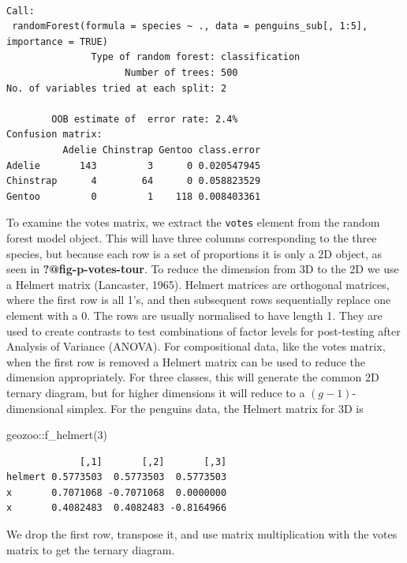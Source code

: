 \documentclass[
  letterpaper,
]{book}
\newenvironment{Shaded}{\begin{snugshade}}{\end{snugshade}}
\newcommand{\DecValTok}[1]{\textcolor[rgb]{0.68,0.00,0.00}{#1}}
\newcommand{\FunctionTok}[1]{\textcolor[rgb]{0.28,0.35,0.67}{#1}}
\newcommand{\NormalTok}[1]{\textcolor[rgb]{0.00,0.23,0.31}{#1}}
\newcommand{\SpecialCharTok}[1]{\textcolor[rgb]{0.37,0.37,0.37}{#1}}
\begin{document}
\begin{verbatim}

Call:
 randomForest(formula = species ~ ., data = penguins_sub[, 1:5],      importance = TRUE) 
               Type of random forest: classification
                     Number of trees: 500
No. of variables tried at each split: 2

        OOB estimate of  error rate: 2.4%
Confusion matrix:
          Adelie Chinstrap Gentoo class.error
Adelie       143         3      0 0.020547945
Chinstrap      4        64      0 0.058823529
Gentoo         0         1    118 0.008403361
\end{verbatim}

To examine the votes matrix, we extract the \texttt{votes} element from
the random forest model object. This will have three columns
corresponding to the three species, but because each row is a set of
proportions it is only a 2D object, as seen in
\textbf{?@fig-p-votes-tour}. To reduce the dimension from 3D to the 2D
we use a Helmert matrix (Lancaster, 1965). Helmert matrices are
orthogonal matrices, where the first row is all 1's, and then subsequent
rows sequentially replace one element with a 0. The rows are usually
normalised to have length 1. They are used to create contrasts to test
combinations of factor levels for post-testing after Analysis of
Variance (ANOVA). For compositional data, like the votes matrix, when
the first row is removed a Helmert matrix can be used to reduce the
dimension appropriately. For three classes, this will generate the
common 2D ternary diagram, but for higher dimensions it will reduce to a
\((g-1)\)-dimensional simplex. For the penguins data, the Helmert matrix
for 3D is

\begin{Shaded}
\begin{Highlighting}[]
\NormalTok{geozoo}\SpecialCharTok{::}\FunctionTok{f\_helmert}\NormalTok{(}\DecValTok{3}\NormalTok{)}
\end{Highlighting}
\end{Shaded}

\begin{verbatim}
             [,1]       [,2]       [,3]
helmert 0.5773503  0.5773503  0.5773503
x       0.7071068 -0.7071068  0.0000000
x       0.4082483  0.4082483 -0.8164966
\end{verbatim}

We drop the first row, transpose it, and use matrix multiplication with
the votes matrix to get the ternary diagram.
\end{document}

